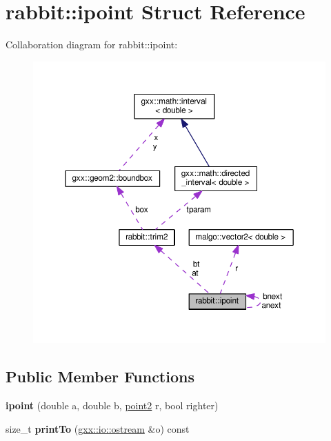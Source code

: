 \hypertarget{structrabbit_1_1ipoint}{}\section{rabbit\+:\+:ipoint Struct Reference}
\label{structrabbit_1_1ipoint}


Collaboration diagram for rabbit\+:\+:ipoint\+:
\nopagebreak
\begin{figure}[H]
\begin{center}
\leavevmode
\includegraphics[width=350pt]{structrabbit_1_1ipoint__coll__graph}
\end{center}
\end{figure}
\subsection*{Public Member Functions}
\begin{DoxyCompactItemize}
\item 
{\bfseries ipoint} (double a, double b, \hyperlink{classmalgo_1_1vector2}{point2} r, bool righter)\hypertarget{structrabbit_1_1ipoint_a685a073f94217eb0785b608687f3bddc}{}\label{structrabbit_1_1ipoint_a685a073f94217eb0785b608687f3bddc}

\item 
size\+\_\+t {\bfseries print\+To} (\hyperlink{classgxx_1_1io_1_1ostream}{gxx\+::io\+::ostream} \&o) const \hypertarget{structrabbit_1_1ipoint_a66f7873c8ce56ab891ab31595260d781}{}\label{structrabbit_1_1ipoint_a66f7873c8ce56ab891ab31595260d781}

\end{DoxyCompactItemize}
